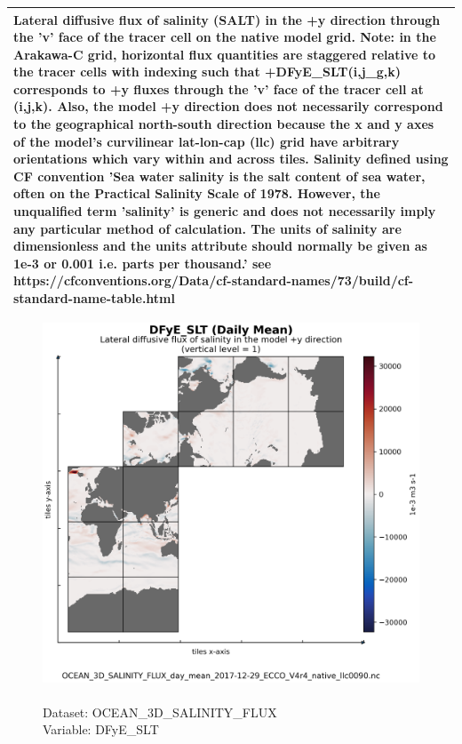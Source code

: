 \begin{longtable}{|p{}|p{}|p{}|p{}|}
\multicolumn{4}{|p{1\textwidth}|}{Lateral diffusive flux of salinity (SALT) in the +y direction through the 'v' face of the tracer cell on the native model grid. Note: in the Arakawa-C grid, horizontal flux quantities are staggered relative to the tracer cells with indexing such that +DFyE\_SLT(i,j\_g,k) corresponds to +y fluxes through the 'v' face of the tracer cell at (i,j,k). Also, the model +y direction does not necessarily correspond to the geographical north-south direction because the x and y axes of the model's curvilinear lat-lon-cap (llc) grid have arbitrary orientations which vary within and across tiles. Salinity defined using CF convention 'Sea water salinity is the salt content of sea water, often on the Practical Salinity Scale of 1978. However, the unqualified term 'salinity' is generic and does not necessarily imply any particular method of calculation. The units of salinity are dimensionless and the units attribute should normally be given as 1e-3 or 0.001 i.e. parts per thousand.' see https://cfconventions.org/Data/cf-standard-names/73/build/cf-standard-name-table.html} \\ \hline
\end{longtable}

\begin{figure}[H]
\centering
\includegraphics[scale=0.5]{../images/plots/native_plots/Ocean_Three-Dimensional_Salinity_Fluxes/DFyE_SLT.png}
\caption{\\Dataset: OCEAN\_3D\_SALINITY\_FLUX\\Variable: DFyE\_SLT}
\label{tab:table-OCEAN_3D_SALINITY_FLUX_DFyE_SLT-Plot}
\end{figure}
\pagebreak
